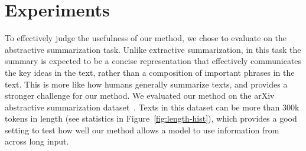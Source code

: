 \documentclass{article}
\begin{document}
\section{Experiments}\label{section:experiments}

To effectively judge the usefulness of our method, we chose to evaluate on the abstractive summarization task. Unlike extractive summarization, in this task the summary is expected to be a concise representation that effectively communicates the key ideas in the text, rather than a composition of important phrases in the text. This is more like how humans generally summarize texts, and provides a stronger challenge for our method. We evaluated our method on the arXiv abstractive summarization dataset~\cite{cohan-etal-2018-discourse}. Texts in this dataset can be more than 300k tokens in length (see statistics in Figure~\ref{fig:length-hist}), which provides a good setting to test how well our method allows a model to use information from across long input.
\end{document}
